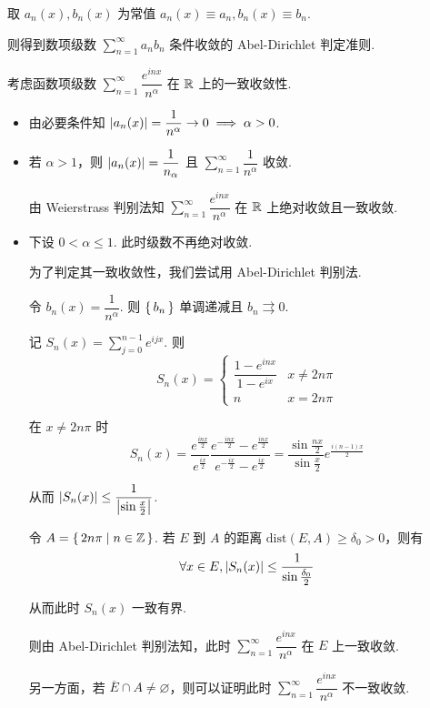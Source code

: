 \begin{hint}
    取 $a_n(x),b_n(x)$ 为常值 $a_n(x)\equiv a_n,b_n(x)\equiv b_n$.
    
    则得到数项级数 $\sum\limits_{n=1}^\infty a_nb_n$ 条件收敛的 Abel-Dirichlet 判定准则.
\end{hint}

\begin{example}
    考虑函数项级数 $\sum\limits_{n=1}^\infty\dfrac{e^{inx}}{n^\alpha}$ 在 $\mathbb{R}$ 上的一致收敛性.

    \begin{itemize}
        \item 由必要条件知 $\left\lvert{a_n(x)}\right\rvert=\dfrac{1}{n^\alpha}\to 0\implies\alpha>0$.
        
        \item 若 $\alpha>1$，则 $\left\lvert{a_n(x)}\right\rvert=\dfrac{1}{n_\alpha}$ 且 $\sum\limits_{n=1}^\infty\dfrac{1}{n^\alpha}$ 收敛.
        
        由 Weierstrass 判别法知 $\sum\limits_{n=1}^\infty\dfrac{e^{inx}}{n^\alpha}$ 在 $\mathbb{R}$ 上绝对收敛且一致收敛.

        \item 下设 $0<\alpha\le 1$. 此时级数不再绝对收敛.
        
        为了判定其一致收敛性，我们尝试用 Abel-Dirichlet 判别法.

        令 $b_n(x)=\dfrac{1}{n^\alpha}$. 则 $\set{b_n}$ 单调递减且 $b_n\rightrightarrows 0$.

        记 $S_n(x)=\sum\limits_{j=0}^{n-1}e^{ijx}$. 则
$$
S_n(x)=\begin{cases}
    \dfrac{1-e^{inx}}{1-e^{ix}} & x\ne 2n\pi\\
    n & x=2n\pi
\end{cases}
$$

        在 $x\ne 2n\pi$ 时
$$
S_n(x)=\frac{e^\frac{inx}{2}}{e^\frac{ix}{2}}\frac{e^{-\frac{inx}{2}}-e^\frac{inx}{2}}{e^{-\frac{ix}{2}}-e^\frac{ix}{2}}=\frac{\sin\frac{nx}{2}}{\sin\frac{x}{2}}e^\frac{i(n-1)x}{2}
$$

        从而 $\left\lvert{S_n(x)}\right\rvert\le\dfrac{1}{\left\lvert{\sin\frac{x}{2}}\right\rvert}$.

        令 $A=\set{2n\pi|n\in\mathbb{Z}}$. 若 $E$ 到 $A$ 的距离 $\mathrm{dist}(E,A)\ge\delta_0>0$，则有
$$
\forall x\in E,\left\lvert{S_n(x)}\right\rvert\le\frac{1}{\sin\frac{\delta_0}{2}}
$$

        从而此时 $S_n(x)$ 一致有界.
        
        则由 Abel-Dirichlet 判别法知，此时 $\sum\limits_{n=1}^\infty\dfrac{e^{inx}}{n^\alpha}$ 在 $E$ 上一致收敛.

        另一方面，若 $\overline{E}\cap A\ne\varnothing$，则可以证明此时 $\sum\limits_{n=1}^\infty\dfrac{e^{inx}}{n^\alpha}$ 不一致收敛.
    \end{itemize}
\end{example}

